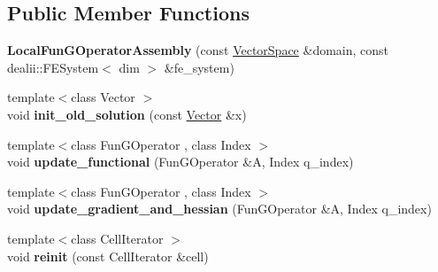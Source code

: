 \subsection*{Public Member Functions}
\begin{DoxyCompactItemize}
\item 
\hypertarget{structSpacy_1_1dealII_1_1Detail_1_1LocalFunGOperatorAssembly_a8f53e50821f8494bd4f5cb2a696aa642}{{\bfseries Local\-Fun\-G\-Operator\-Assembly} (const \hyperlink{classSpacy_1_1VectorSpace}{Vector\-Space} \&domain, const dealii\-::\-F\-E\-System$<$ dim $>$ \&fe\-\_\-system)}\label{structSpacy_1_1dealII_1_1Detail_1_1LocalFunGOperatorAssembly_a8f53e50821f8494bd4f5cb2a696aa642}

\item 
\hypertarget{structSpacy_1_1dealII_1_1Detail_1_1LocalFunGOperatorAssembly_a22bd8cee3366cdac84f1512802864454}{{\footnotesize template$<$class Vector $>$ }\\void {\bfseries init\-\_\-old\-\_\-solution} (const \hyperlink{group__VectorSpaceGroup_ga65d64ee5f22f492639d0f950aa931071}{Vector} \&x)}\label{structSpacy_1_1dealII_1_1Detail_1_1LocalFunGOperatorAssembly_a22bd8cee3366cdac84f1512802864454}

\item 
\hypertarget{structSpacy_1_1dealII_1_1Detail_1_1LocalFunGOperatorAssembly_a72f1af3092e61811503407474f769d69}{{\footnotesize template$<$class Fun\-G\-Operator , class Index $>$ }\\void {\bfseries update\-\_\-functional} (Fun\-G\-Operator \&A, Index q\-\_\-index)}\label{structSpacy_1_1dealII_1_1Detail_1_1LocalFunGOperatorAssembly_a72f1af3092e61811503407474f769d69}

\item 
\hypertarget{structSpacy_1_1dealII_1_1Detail_1_1LocalFunGOperatorAssembly_a325125699c023099785e2b139181b00b}{{\footnotesize template$<$class Fun\-G\-Operator , class Index $>$ }\\void {\bfseries update\-\_\-gradient\-\_\-and\-\_\-hessian} (Fun\-G\-Operator \&A, Index q\-\_\-index)}\label{structSpacy_1_1dealII_1_1Detail_1_1LocalFunGOperatorAssembly_a325125699c023099785e2b139181b00b}

\item 
\hypertarget{structSpacy_1_1dealII_1_1Detail_1_1LocalAssemblyBase_aa626f61838942e829ecd56bcdf00eb36}{{\footnotesize template$<$class Cell\-Iterator $>$ }\\void {\bfseries reinit} (const Cell\-Iterator \&cell)}\label{structSpacy_1_1dealII_1_1Detail_1_1LocalAssemblyBase_aa626f61838942e829ecd56bcdf00eb36}


\end{DoxyCompactItemize}
